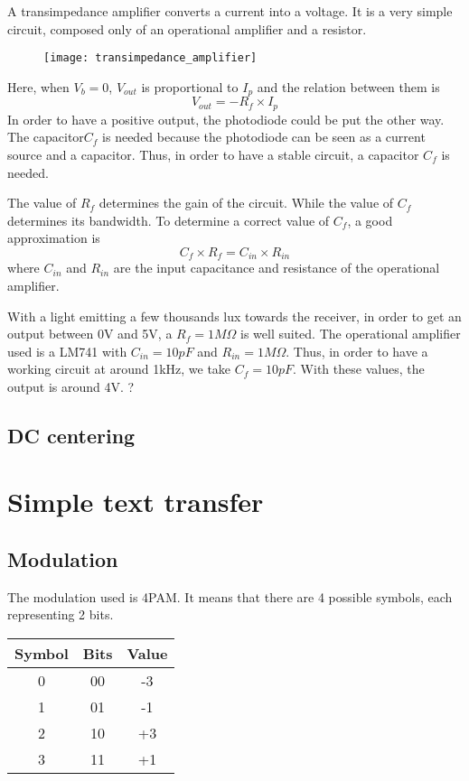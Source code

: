 \documentclass[12pt]{report}
\begin{document}
A transimpedance amplifier converts a current into a voltage. It is a very simple circuit, composed only of an operational amplifier and a resistor.

\begin{figure}[h]
\centering
\texttt{[image: transimpedance\_amplifier]}
\end{figure}

Here, when $V_b = 0$, $V_{out}$ is proportional to $I_p$ and the relation between them is $$V_{out} = - R_f \times I_p$$
In order to have a positive output, the photodiode could be put the other way.
The capacitor$ C_f$ is needed because the photodiode can be seen as a current source and a capacitor. Thus, in order to have a stable circuit, a capacitor $C_f$ is needed.

The value of $R_f$ determines the gain of the circuit. While the value of $C_f$ determines its bandwidth. To determine a correct value of $C_f$, a good approximation is $$C_f \times R_f = C_{in} \times R_{in}$$ where $C_{in}$ and $R_{in}$ are the input capacitance and resistance of the operational amplifier.

With a light emitting a few thousands lux towards the receiver, in order to get an output between 0V and 5V, a $R_f = 1M\Omega$ is well suited.
 The operational amplifier used is a LM741 with $C_{in} = 10pF$ and $R_{in} = 1M\Omega$. Thus, in order to have a working circuit at around 1kHz, we take $C_f = 10pF$.
With these values, the output is around 4V. ?

\subsection{DC centering}






\section{Simple text transfer}

\subsection{Modulation}

The modulation used is 4PAM.
It means that there are 4 possible symbols, each representing 2 bits.

\begin{center}
\begin{tabular}{c|c|c}
Symbol&Bits&Value\\
\hline
0&00&-3\\
1&01&-1\\
2&10&+3\\
3&11&+1\\
\end{tabular}
\end{center}
\end{document}
